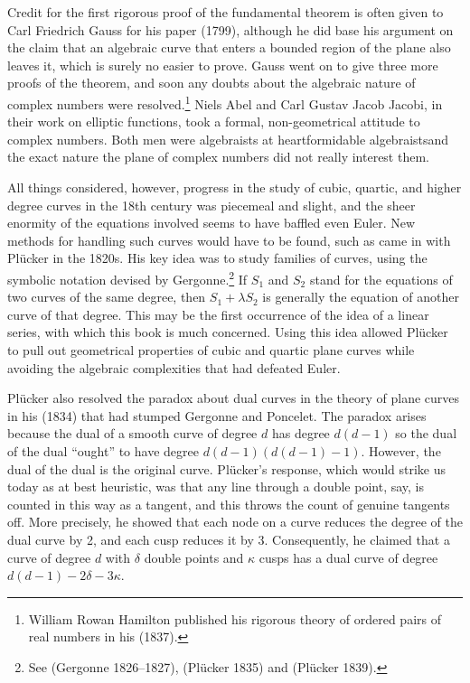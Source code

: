 Credit for the first rigorous proof of the fundamental theorem is often given to Carl Friedrich Gauss for his paper (1799), although he did base his argument on the claim that an algebraic curve that enters a bounded region of the plane also leaves it,  which is surely no easier to prove.  Gauss went on to give three more proofs of the theorem, and soon any doubts about the algebraic nature of complex numbers were resolved.\footnote{William Rowan Hamilton published his rigorous theory of ordered pairs of real numbers in his (1837).} Niels Abel and Carl Gustav Jacob Jacobi, in their work  on elliptic functions, took a formal, non-geometrical attitude to complex numbers.  Both men were algebraists at heart\emdash formidable algebraists\emdash and the exact nature the plane of complex numbers did not really interest them. 

All things considered, however, progress in the study of cubic, quartic, and higher degree curves in the 18th century was piecemeal and slight, and the sheer enormity of the equations involved seems to have baffled even Euler. New methods for handling such curves would have to be found, such as came in with Pl\"ucker in the 1820s. His key idea was to study families of curves, using the symbolic notation devised by Gergonne.\footnote{See  (Gergonne 1826--1827), (Pl\"ucker 1835) and (Pl\"ucker 1839).} If $S_1$ and $S_2$ stand for the equations of two curves of the same degree, then $S_1 + \lambda S_2$ is generally the equation of another curve of that degree. This may be the first occurrence of the idea of a linear series, with which this book is much concerned. Using this idea allowed Pl\"ucker to pull out geometrical properties of cubic and quartic plane curves while avoiding the algebraic complexities that had defeated Euler.  

Pl\"ucker also resolved the paradox about dual curves in the theory of plane curves in his (1834) that had stumped Gergonne and Poncelet. The paradox arises because the dual of a smooth curve of degree $d$ has degree $d(d-1)$
so the dual of the dual ``ought'' to have degree $d(d-1)(d(d-1)-1)$. However, the dual of the dual is the original curve.  
Pl\"ucker's response, which would strike us today as at best heuristic, was that any line through a double point, say, is counted in this way as a tangent, and this throws the count of genuine tangents off. More precisely, he  showed that each node on a curve reduces the degree of the dual curve by 2, and each cusp reduces it by 3. Consequently, he claimed that  a curve of degree $d$ with $\delta$ double points and $\kappa$ cusps has a dual curve  of degree $d(d-1) -  2\delta - 3\kappa.$ 




